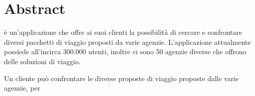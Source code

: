 \section{Abstract}
\AppName è un'applicazione che offre ai suoi clienti la possibilità di cercare e confrontare diversi pacchetti di viaggio proposti da varie agenzie. L'applicazione attualmente possiede all'incirca 300.000 utenti, inoltre ci sono 50 agenzie diverse che offrono delle soluzioni di viaggio.

Un cliente può confrontare le diverse proposte di viaggio proposte dalle varie agenzie, per 